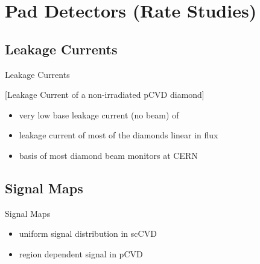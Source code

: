 \section{Pad Detectors (Rate Studies)}
\subsection{Leakage Currents}
\begin{frame}{Leakage Currents}
	
	[Leakage Current of a non-irradiated pCVD diamond]
		
	\begin{itemize}\itemfill
		\item very low base leakage current (no beam) of 
		\item leakage current of most of the diamonds linear in flux
		\item basis of most diamond beam monitors at CERN
	\end{itemize}
	
\end{frame}
\subsection{Signal Maps}
\begin{frame}{Signal Maps}

	
	\begin{itemize} \itemfill
		\item uniform signal distribution in scCVD
		\item region dependent signal in pCVD
	\end{itemize}
	
\end{frame}
